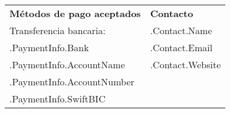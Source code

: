 \documentclass{article}
\begin{document}
\vspace{3cm}

\begin{tabular}{@{}p{}p{}@{}}
    \textbf{Métodos de pago aceptados} & \textbf{Contacto} \\
    Transferencia bancaria: &  {{ .Contact.Name }}\\
    {{ .PaymentInfo.Bank }} &   {{ .Contact.Email }} \\
    {{ .PaymentInfo.AccountName }} & {{ .Contact.Website }} \\
    {{ .PaymentInfo.AccountNumber }} & \\
    {{ .PaymentInfo.SwiftBIC }} & \\
\end{tabular}

\vspace{1cm}
\end{document}
